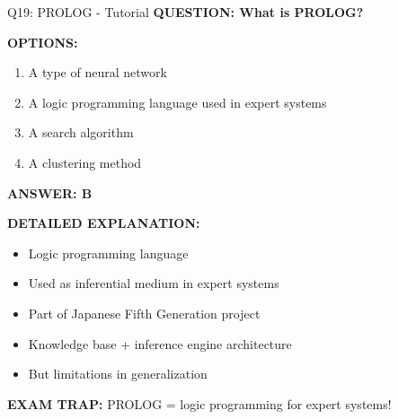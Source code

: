 \documentclass[8pt]{beamer}
\begin{document}
	\begin{frame}{Q19: PROLOG - Tutorial}
		\fontsize{6.5}{7.5}\selectfont
		\textbf{QUESTION: What is PROLOG?}
		
		\vspace{0.1cm}
		\textbf{OPTIONS:}
		\begin{enumerate}
			\item A type of neural network
			\item A logic programming language used in expert systems
			\item A search algorithm
			\item A clustering method
		\end{enumerate}
		
		\vspace{0.1cm}
		\textcolor{myblue}{\textbf{ANSWER: B}}
		
		\vspace{0.1cm}
		\textbf{DETAILED EXPLANATION:}
		\begin{itemize}
			\item Logic programming language
			\item Used as inferential medium in expert systems
			\item Part of Japanese Fifth Generation project
			\item Knowledge base + inference engine architecture
			\item But limitations in generalization
		\end{itemize}
		
		\vspace{0.1cm}
		\textcolor{myred}{\textbf{EXAM TRAP:}} PROLOG = \textcolor{myblue}{logic programming for expert systems}!
	\end{frame}
	
\end{document}
